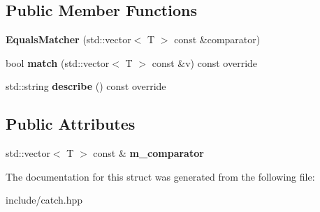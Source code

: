 \subsection*{Public Member Functions}
\begin{DoxyCompactItemize}
\item 
{\bfseries Equals\+Matcher} (std\+::vector$<$ T $>$ const \&comparator)\hypertarget{structCatch_1_1Matchers_1_1Vector_1_1EqualsMatcher_a3846c47780d1991dcfe87aefded98008}{}\label{structCatch_1_1Matchers_1_1Vector_1_1EqualsMatcher_a3846c47780d1991dcfe87aefded98008}

\item 
bool {\bfseries match} (std\+::vector$<$ T $>$ const \&v) const override\hypertarget{structCatch_1_1Matchers_1_1Vector_1_1EqualsMatcher_a2d96cca58a44151fddc5257eda3305da}{}\label{structCatch_1_1Matchers_1_1Vector_1_1EqualsMatcher_a2d96cca58a44151fddc5257eda3305da}

\item 
std\+::string {\bfseries describe} () const override\hypertarget{structCatch_1_1Matchers_1_1Vector_1_1EqualsMatcher_a36b5f7ecada4081d6c65bebe8ddea6f4}{}\label{structCatch_1_1Matchers_1_1Vector_1_1EqualsMatcher_a36b5f7ecada4081d6c65bebe8ddea6f4}

\end{DoxyCompactItemize}
\subsection*{Public Attributes}
\begin{DoxyCompactItemize}
\item 
std\+::vector$<$ T $>$ const \& {\bfseries m\+\_\+comparator}\hypertarget{structCatch_1_1Matchers_1_1Vector_1_1EqualsMatcher_a56f7aa6f110a12b1b9aeb0cabbc9d755}{}\label{structCatch_1_1Matchers_1_1Vector_1_1EqualsMatcher_a56f7aa6f110a12b1b9aeb0cabbc9d755}

\end{DoxyCompactItemize}


The documentation for this struct was generated from the following file\+:\begin{DoxyCompactItemize}
\item 
include/catch.\+hpp\end{DoxyCompactItemize}
